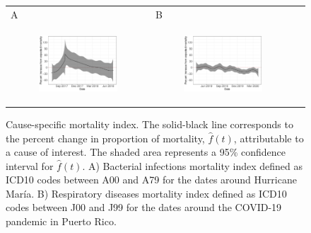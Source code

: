 \documentclass[11pt]{article}
\begin{document}
\begin{figure}[ht]
	\begin{tabular}{lll}
	A&B\\
	\begin{subfigure}[t]{0.49\linewidth}
		\centering
		\includegraphics[width=1\linewidth]{figs/figure-4a-bacterial-infections.pdf} 
	\end{subfigure}&
	\begin{subfigure}[t]{0.49\linewidth}
		\centering
		\includegraphics[width=1\linewidth]{figs/figure-4b-respiratory.pdf}
	\end{subfigure}&\\
    \end{tabular}
	\caption{Cause-specific mortality index. The solid-black line corresponds to the percent change in proportion of mortality, $\hat{f}(t)$, attributable to a cause of interest. The shaded area represents a 95\% confidence interval for $\hat{f}(t)$. A) Bacterial infections mortality index defined as ICD10 codes between A00 and A79 for the dates around Hurricane Mar\'ia. B) Respiratory diseases mortality index defined as ICD10 codes between J00 and J99 for the dates around the COVID-19 pandemic in Puerto Rico.}
	\label{fig:mortality-index}
\end{figure}
\end{document}
